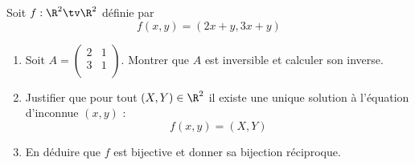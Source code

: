 \documentclass[a4paper, 11pt,reqno]{article}
\begin{document}
\begin{exercice}
Soit $f  : \R^2 \tv \R^2 $ définie par 
$$f(x,y)=(2x+y,  3x+y)$$

\begin{enumerate}
\item Soit $A = \begin{pmatrix}
2 & 1\\
3 & 1\\
\end{pmatrix}$. Montrer que $A$ est inversible et calculer son inverse. 

\item Justifier que pour tout $(X,Y)\in \R^2$ il existe une unique solution à l'équation d'inconnue $(x,y)$ : $$f(x,y)=(X,Y)$$
\item En déduire que $f$ est bijective et donner sa bijection réciproque. 
\end{enumerate}

\end{exercice}

\begin{correction}

\end{correction}

\vspace{0.5cm}
\end{document}
